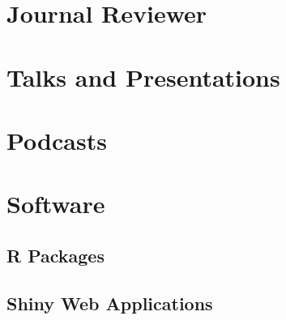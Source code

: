 \documentclass[11pt,a4paper]{moderncv}
\begin{document}
\begin{refsection}
\nocite{*}
\printbibliography[title={Books}]
\end{refsection}


\begin{refsection}
\nocite{*}
\printbibliography[title={Peer-Reviewed Publications}, prenote=sharedauth]
\end{refsection}








%

\section{Journal Reviewer}



\section{Talks and Presentations}



\section{Podcasts}





\section{Software}
\subsection{R Packages}




\vspace{1em}
\subsection{Shiny Web Applications}

\end{document}
